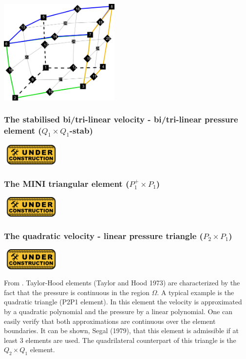 \begin{center}
\includegraphics[width=6cm]{images/q2q1/q2numering}
\end{center}


\subsubsection{The stabilised bi/tri-linear velocity -  bi/tri-linear pressure element ($Q_1\times Q_1$-stab)}
\includegraphics[width=3cm]{images/under_construction}

\subsubsection{The MINI triangular element ($P_1^+\times P_1$)}
\includegraphics[width=3cm]{images/under_construction}

\subsubsection{The quadratic velocity - linear pressure triangle ($P_2\times P_1$)}
\includegraphics[width=3cm]{images/under_construction}

From \cite{segal}.
Taylor-Hood elements (Taylor and Hood 1973) 
are characterized by the fact that the pressure is continuous in the region $\Omega$. 
A typical example is the quadratic triangle (P2P1 element).
In this element the velocity is approximated by a quadratic polynomial and the pressure by a
linear polynomial. One can easily verify that both approximations are continuous over 
the element boundaries. 
It can be shown, Segal (1979), that this element is admissible if at least 3 elements 
are used. The quadrilateral counterpart of this triangle is the $Q_2\times Q_1$ element.




